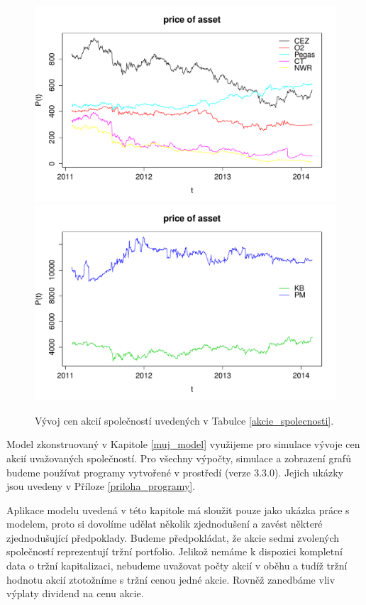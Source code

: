 \documentclass[a4paper,12pt]{report}
\makeatletter
\theoremstyle{definition} \newtheorem{definice}[veta]{Definice}
\theoremstyle{remark}
\def\R{\scalebox{\f@size}{\usebox\rbox}\xspace}
\makeatother
\begin{document}
\begin{figure}[!htbp]
  \centering 
	\includegraphics[width=13.5cm, clip, trim= 0 15 25 50]{IMG/data_price_of_asset_ostatni.pdf}\\[5mm]
	\includegraphics[width=13.5cm, clip, trim= 0 15 25 50]{IMG/data_price_of_asset_KBPM_v2.pdf}	
  \caption{Vývoj cen akcií společností uvedených v Tabulce \ref{akcie_spolecnosti}.}  \label{model_price_of_asset}
\end{figure}

Model zkonstruovaný v Kapitole \ref{muj_model} využijeme pro simulace vývoje cen akcií uvažovaných společností.
Pro všechny výpočty, simulace a zobrazení grafů budeme používat programy vytvořené v prostředí \R (verze 3.3.0).
Jejich ukázky jsou uvedeny v Příloze \ref{priloha_programy}.

Aplikace modelu uvedená v této kapitole má sloužit pouze jako ukázka práce s modelem, proto si dovolíme udělat několik zjednodušení a zavést některé zjednodušující předpoklady.
Budeme předpokládat, že akcie sedmi zvolených společností reprezentují tržní portfolio.
Jelikož nemáme k dispozici kompletní data o tržní kapitalizaci, nebudeme uvažovat počty akcií v oběhu a tudíž tržní hodnotu akcií ztotožníme s tržní cenou jedné akcie.
Rovněž zanedbáme vliv výplaty dividend na cenu akcie.
\end{document}
